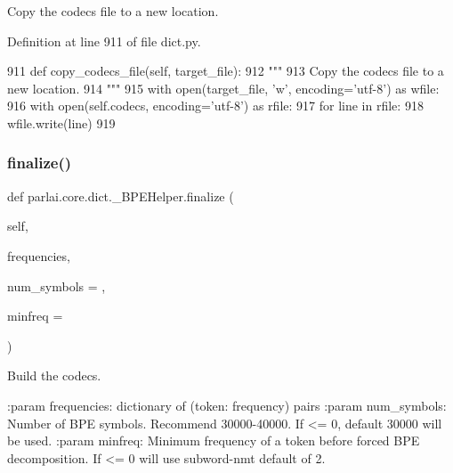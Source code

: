 \begin{DoxyVerb}Copy the codecs file to a new location.
\end{DoxyVerb}
 

Definition at line 911 of file dict.\+py.


\begin{DoxyCode}
911     \textcolor{keyword}{def }copy\_codecs\_file(self, target\_file):
912         \textcolor{stringliteral}{"""}
913 \textcolor{stringliteral}{        Copy the codecs file to a new location.}
914 \textcolor{stringliteral}{        """}
915         with open(target\_file, \textcolor{stringliteral}{'w'}, encoding=\textcolor{stringliteral}{'utf-8'}) \textcolor{keyword}{as} wfile:
916             with open(self.codecs, encoding=\textcolor{stringliteral}{'utf-8'}) \textcolor{keyword}{as} rfile:
917                 \textcolor{keywordflow}{for} line \textcolor{keywordflow}{in} rfile:
918                     wfile.write(line)
919 \end{DoxyCode}
\mbox{\label{classparlai_1_1core_1_1dict_1_1__BPEHelper_ae93cf51522695ac3f45fc19eee94f64c}} 
\subsubsection{\texorpdfstring{finalize()}{finalize()}}
{\footnotesize\ttfamily def parlai.\+core.\+dict.\+\_\+\+B\+P\+E\+Helper.\+finalize (\begin{DoxyParamCaption}\item[{}]{self,  }\item[{}]{frequencies,  }\item[{}]{num\+\_\+symbols = {},  }\item[{}]{minfreq = {} }\end{DoxyParamCaption})}

\begin{DoxyVerb}Build the codecs.

:param frequencies:
    dictionary of (token: frequency) pairs
:param num_symbols:
    Number of BPE symbols. Recommend 30000-40000.  If <= 0, default
    30000 will be used.
:param minfreq:
    Minimum frequency of a token before forced BPE decomposition. If <=
    0 will use subword-nmt default of 2.
\end{DoxyVerb}
 

